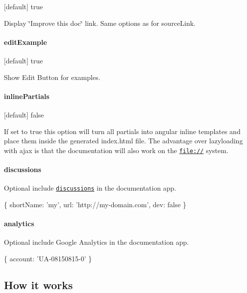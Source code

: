 \mbox{[}default\mbox{]} true

Display \char`\"{}\+Improve this doc\char`\"{} link. Same options as for source\+Link.

\paragraph*{edit\+Example}

\mbox{[}default\mbox{]} true

Show Edit Button for examples.

\paragraph*{inline\+Partials}

\mbox{[}default\mbox{]} false

If set to true this option will turn all partials into angular inline templates and place them inside the generated {\ttfamily index.\+html} file. The advantage over lazyloading with ajax is that the documentation will also work on the {\ttfamily \href{file://}{\tt file\+://}} system.

\paragraph*{discussions}

Optional include \href{http://disqus.com}{\tt discussions} in the documentation app.


\begin{DoxyCode}
\{
  shortName: \textcolor{stringliteral}{'my'},
  url: \textcolor{stringliteral}{'http://my-domain.com'},
  dev: \textcolor{keyword}{false}
\}
\end{DoxyCode}


\paragraph*{analytics}

Optional include Google Analytics in the documentation app.


\begin{DoxyCode}
\{
  account: \textcolor{stringliteral}{'UA-08150815-0'}
\}
\end{DoxyCode}


\subsection*{How it works}

